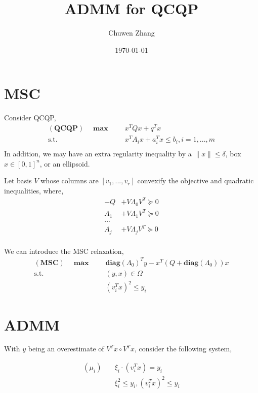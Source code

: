 \documentclass[a4paper, 10pt]{article}
\title{ADMM for QCQP}
\author{Chuwen Zhang}
\date{\today}
\newcommand{\diag}{\mathbf{diag}}
\newcommand{\model}[1]{(\textbf{#1})}
\newcommand{\mx}{\mathbf{\max}\;}
\begin{document}
\maketitle
\section{MSC}

Consider QCQP,
\begin{equation}
    \label{eq:inhoqcqp}
    \begin{aligned}
        \model{QCQP} \quad \mx \quad & x^T Qx + q^T x                           \\
        \textrm{s.t.} \quad          & x^T A_i x + a_i^T x \le b_i, i=1, ..., m \\
    \end{aligned}
\end{equation}
In addition, we may have an extra regularity inequality by a \(\|x\| \le \delta\), box \(x \in [0, 1]^n\), or an ellipsoid.


Let basis \(V\) whose columns are \([v_1, ..., v_r]\) convexify the objective and quadratic inequalities, where,
\begin{align*}
    - Q & +  V\Lambda_0 V^T \succeq 0 \\
    A_1 & +  V\Lambda_1 V^T \succeq 0 \\
    ...                               \\
    A_j & +  V\Lambda_j V^T \succeq 0 \\
\end{align*}

We can introduce the MSC relaxation,
\begin{align}
    \model{MSC} \quad \mx \quad & \diag(\Lambda_0)^Ty - x^T\left(Q + \diag(\Lambda_0)\right)x \\
    \mathrm{s.t.} \quad         & (y, x) \in \Omega                                           \\
                                & (v_i^Tx)^2 \le y_i
\end{align}


\section{ADMM}

With \(y\) being an overestimate of \(V^Tx \circ V^Tx\), consider the following system,

\begin{align*}
    ( \mu_i)    \quad & \xi_i \cdot (v_i^Tx) = y_i           \\
                      & \xi_i^2 \le y_i,  (v_i^Tx)^2 \le y_i
\end{align*}
\end{document}
